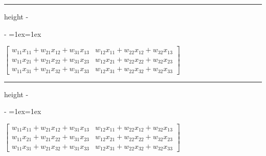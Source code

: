 \documentclass[letterpaper,10pt,english]{sphinxmanual}
\makeatletter
\newenvironment{nbsphinxfancyoutput}{%
    \let\sphinxincludegraphics\nbsphinxincludegraphics
    \nbsphinx@image@maxheight\textheight
    \advance\nbsphinx@image@maxheight -2\fboxsep   %
    \advance\nbsphinx@image@maxheight -2\fboxrule  %
    \advance\nbsphinx@image@maxheight -\baselineskip
\def\nbsphinxfcolorbox{\spx@fcolorbox{nbsphinx-code-border}{white}}%
\def\FrameCommand{\nbsphinxfcolorbox\nbsphinxfancyaddprompt\@empty}%
\def\FirstFrameCommand{\nbsphinxfcolorbox\nbsphinxfancyaddprompt\sphinxVerbatim@Continues}%
\def\MidFrameCommand{\nbsphinxfcolorbox\sphinxVerbatim@Continued\sphinxVerbatim@Continues}%
\def\LastFrameCommand{\nbsphinxfcolorbox\sphinxVerbatim@Continued\@empty}%
\MakeFramed{\advance\hsize-\width\@totalleftmargin\z@\linewidth\hsize\@setminipage}%
\lineskip=1ex\lineskiplimit=1ex\raggedright%
}{\par\unskip\@minipagefalse\endMakeFramed}
\def\nbsphinxfancyaddprompt{\ifvoid\nbsphinxpromptbox\else
    \kern\fboxrule\kern\fboxsep
    \copy\nbsphinxpromptbox
    \kern-\ht\nbsphinxpromptbox\kern-\dp\nbsphinxpromptbox
    \kern-\fboxsep\kern-\fboxrule\nointerlineskip
    \fi}
\newlength\nbsphinxcodecellspacing
\newcommand*{\nbsphinxincludegraphics}[2][]{%
    \gdef\spx@includegraphics@options{#1}%
    \setbox\spx@image@box\hbox{\texttt{[image: \#2]}}%
    \in@false
    \ifdim \wd\spx@image@box>\linewidth
      \g@addto@macro\spx@includegraphics@options{,width=\linewidth}%
      \in@true
    \fi
    \ifdim \ht\spx@image@box>\nbsphinx@image@maxheight
      \g@addto@macro\spx@includegraphics@options{,height=\nbsphinx@image@maxheight}%
      \in@true
    \fi
    \ifin@
      \g@addto@macro\spx@includegraphics@options{,keepaspectratio}%
    \fi
    \setbox\spx@image@box\box\voidb@x %
    \expandafter\includegraphics\expandafter[\spx@includegraphics@options]{#2}%
}%
\makeatother
\begin{document}
\hrule height -\fboxrule\relax
\vspace{\nbsphinxcodecellspacing}

\savebox\nbsphinxpromptbox[0pt][r]{\color{nbsphinxout}\Verb|\strut{[8]:}\,|}

\begin{nbsphinxfancyoutput}
$\displaystyle \left[\begin{matrix}w_{11} x_{11} + w_{21} x_{12} + w_{31} x_{13} & w_{12} x_{11} + w_{22} x_{12} + w_{32} x_{13}\\w_{11} x_{21} + w_{21} x_{22} + w_{31} x_{23} & w_{12} x_{21} + w_{22} x_{22} + w_{32} x_{23}\\w_{11} x_{31} + w_{21} x_{32} + w_{31} x_{33} & w_{12} x_{31} + w_{22} x_{32} + w_{32} x_{33}\end{matrix}\right]$
\end{nbsphinxfancyoutput}

{
\begin{sphinxVerbatim}[commandchars=\\\{\}]
\llap{\color{nbsphinxin}[9]:\,\hspace{\fboxrule}\hspace{\fboxsep}}  
\end{sphinxVerbatim}
}

\hrule height -\fboxrule\relax
\vspace{\nbsphinxcodecellspacing}

\savebox\nbsphinxpromptbox[0pt][r]{\color{nbsphinxout}\Verb|\strut{[9]:}\,|}

\begin{nbsphinxfancyoutput}
$\displaystyle \left[\begin{matrix}w_{11} x_{11} + w_{21} x_{12} + w_{31} x_{13} & w_{12} x_{11} + w_{22} x_{12} + w_{32} x_{13}\\w_{11} x_{21} + w_{21} x_{22} + w_{31} x_{23} & w_{12} x_{21} + w_{22} x_{22} + w_{32} x_{23}\\w_{11} x_{31} + w_{21} x_{32} + w_{31} x_{33} & w_{12} x_{31} + w_{22} x_{32} + w_{32} x_{33}\end{matrix}\right]$
\end{nbsphinxfancyoutput}

{
\begin{sphinxVerbatim}[commandchars=\\\{\}]
\llap{\color{nbsphinxin}[10]:\,\hspace{\fboxrule}\hspace{\fboxsep}} 
\end{sphinxVerbatim}
}
\end{document}
